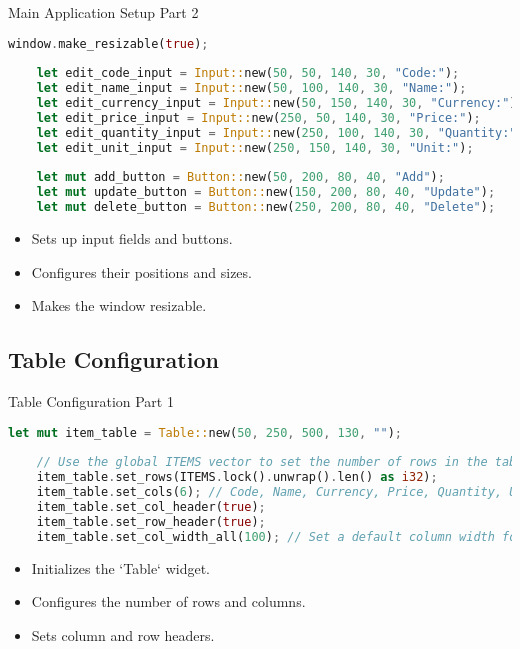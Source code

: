 \documentclass[aspectratio=169, table]{beamer}
\begin{document}
\begin{frame}[fragile]{Main Application Setup Part 2}
\begin{lstlisting}[language=Rust]
	window.make_resizable(true);
	
	let edit_code_input = Input::new(50, 50, 140, 30, "Code:");
	let edit_name_input = Input::new(50, 100, 140, 30, "Name:");
	let edit_currency_input = Input::new(50, 150, 140, 30, "Currency:");
	let edit_price_input = Input::new(250, 50, 140, 30, "Price:");
	let edit_quantity_input = Input::new(250, 100, 140, 30, "Quantity:");
	let edit_unit_input = Input::new(250, 150, 140, 30, "Unit:");
	
	let mut add_button = Button::new(50, 200, 80, 40, "Add");
	let mut update_button = Button::new(150, 200, 80, 40, "Update");
	let mut delete_button = Button::new(250, 200, 80, 40, "Delete");
\end{lstlisting}

\begin{itemize}
	\item Sets up input fields and buttons.
	\item Configures their positions and sizes.
	\item Makes the window resizable.
\end{itemize}
\end{frame}

\subsection{Table Configuration}
\begin{frame}[fragile]{Table Configuration Part 1}
\begin{lstlisting}[language=Rust]
	let mut item_table = Table::new(50, 250, 500, 130, "");
	
	// Use the global ITEMS vector to set the number of rows in the table
	item_table.set_rows(ITEMS.lock().unwrap().len() as i32);
	item_table.set_cols(6); // Code, Name, Currency, Price, Quantity, Unit
	item_table.set_col_header(true);
	item_table.set_row_header(true);
	item_table.set_col_width_all(100); // Set a default column width for all columns
\end{lstlisting}

\begin{itemize}
	\item Initializes the `Table` widget.
	\item Configures the number of rows and columns.
	\item Sets column and row headers.
\end{itemize}
\end{frame}
\end{document}
